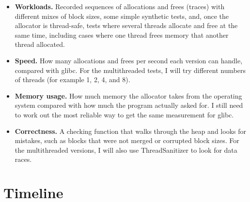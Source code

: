\documentclass[12pt,letterpaper]{article}
\begin{document}
\begin{itemize}
    \item \textbf{Workloads.} Recorded sequences of allocations and frees (traces) with different mixes of block sizes, some simple synthetic tests, and, once the allocator is thread-safe, tests where several threads allocate and free at the same time, including cases where one thread frees memory that another thread allocated.
    \item \textbf{Speed.} How many allocations and frees per second each version can handle, compared with glibc. For the multithreaded tests, I will try different numbers of threads (for example 1, 2, 4, and 8).
    \item \textbf{Memory usage.} How much memory the allocator takes from the operating system compared with how much the program actually asked for. I still need to work out the most reliable way to get the same measurement for glibc.
    \item \textbf{Correctness.} A checking function that walks through the heap and looks for mistakes, such as blocks that were not merged or corrupted block sizes. For the multithreaded versions, I will also use ThreadSanitizer to look for data races.
\end{itemize}

\section*{Timeline}
\end{document}
